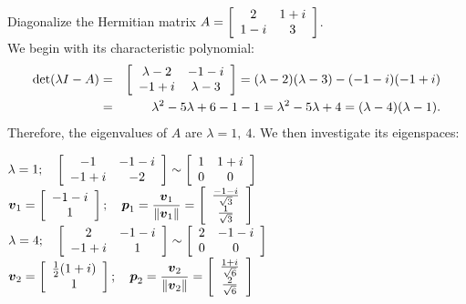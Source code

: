 \begin{Exam}\label{uni} Diagonalize the Hermitian matrix $A = \mtx{cc}{2 & 1+i \\ 1-i & 3}$.\\

We begin with its characteristic polynomial: 
\begin{eqnarray*}\det(\lambda I - A) &=& \mtx{cc}{\lambda-2 & -1-i \\ -1+i & \lambda-3} = (\lambda -2)(\lambda -3) - (-1-i)(-1+i)\\
&=& \lambda^2-5\lambda + 6 - 1-1 = \lambda^2-5\lambda +4 = (\lambda-4)(\lambda -1).
\end{eqnarray*}
 Therefore, the eigenvalues of $A$ are $\lambda = 1,\ 4$. We then investigate its eigenspaces:
 \begin{multicols}{2}
 $\lambda = 1;\quad \mtx{cc}{-1 & -1-i \\ -1+i & -2} \sim \mtx{cc}{1 & 1+i \\ 0 & 0 }$\\
 $\bb v_1 = \mtx{c}{-1-i \\ 1};\quad \bb p_1 = \dfrac{\bb v_1}{\Vert\bb v_1\Vert} = \mtx{c}{\frac{-1-i}{\sqrt{3}} \\ \frac{1}{\sqrt{3}}}$\\

     $\lambda = 4;\quad \mtx{cc}{2 & -1-i \\ -1+i & 1} \sim \mtx{cc}{2 & -1-i \\ 0 & 0 }$\\
    $\bb v_2 = \mtx{c}{\frac{1}{2}(1+i) \\ 1};\quad \bb p_2 = \dfrac{\bb v_2}{\Vert\bb v_2\Vert} = \mtx{c}{\frac{1+i}{\sqrt{6}} \\ \frac{2}{\sqrt{6}}}$\\
\end{multicols}


\end{Exam}

